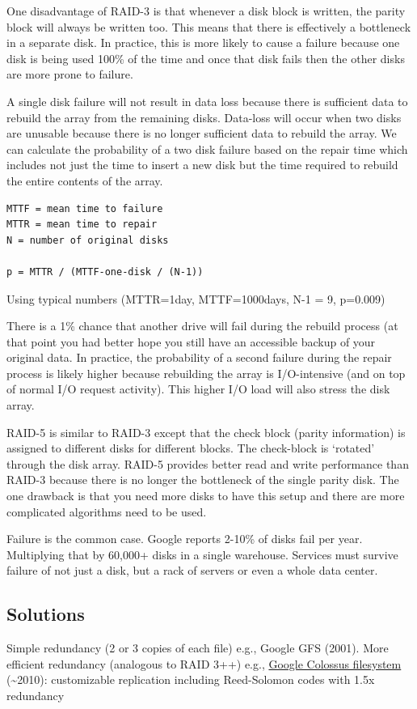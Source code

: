 One disadvantage of RAID-3 is that whenever a disk block is written, the parity block will always be written too.
This means that there is effectively a bottleneck in a separate disk.
In practice, this is more likely to cause a failure because one disk is being used 100\% of the time and once that disk fails then the other disks are more prone to failure.

A single disk failure will not result in data loss because there is sufficient data to rebuild the array from the remaining disks.
Data-loss will occur when two disks are unusable because there is no longer sufficient data to rebuild the array.
We can calculate the probability of a two disk failure based on the repair time which includes not just the time to insert a new disk but the time required to rebuild the entire contents of the array.

\begin{verbatim}
MTTF = mean time to failure
MTTR = mean time to repair
N = number of original disks

p = MTTR / (MTTF-one-disk / (N-1))
\end{verbatim}

Using typical numbers (MTTR=1day, MTTF=1000days, N-1 = 9, p=0.009)

There is a 1\% chance that another drive will fail during the rebuild process (at that point you had better hope you still have an accessible backup of your original data.
In practice, the probability of a second failure during the repair process is likely higher because rebuilding the array is I/O-intensive (and on top of normal I/O request activity).
This higher I/O load will also stress the disk array.

RAID-5 is similar to RAID-3 except that the check block (parity information) is assigned to different disks for different blocks.
The check-block is `rotated' through the disk array.
RAID-5 provides better read and write performance than RAID-3 because there is no longer the bottleneck of the single parity disk.
The one drawback is that you need more disks to have this setup and there are more complicated algorithms need to be used.

Failure is the common case.
Google reports 2-10\% of disks fail per year.
Multiplying that by 60,000+ disks in a single warehouse.
Services must survive failure of not just a disk, but a rack of servers or even a whole data center.

\subsection{Solutions}
Simple redundancy (2 or 3 copies of each file) e.g., Google GFS (2001).
More efficient redundancy (analogous to RAID 3++) e.g., \href{http://goo.gl/LwFIy}{Google Colossus filesystem} (\textasciitilde{}2010): customizable replication including Reed-Solomon codes with 1.5x redundancy


